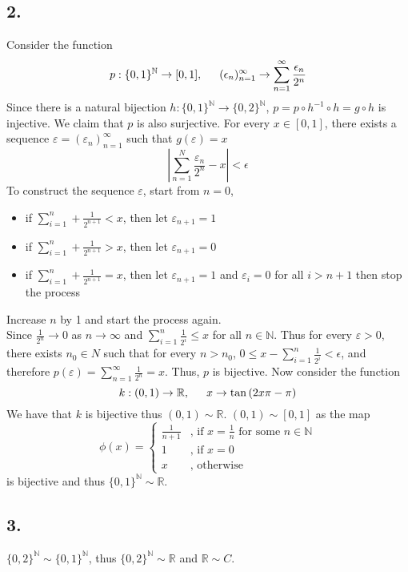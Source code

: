 \documentclass[11pt]{article}
\theoremstyle{mystyle}
\theoremstyle{definition}
\begin{document}
\subsection*{2.}
Consider the function 
\[
  p: \{0,1\}^\mathbb{N} \to [0,1], \indent (\epsilon_n)_{n=1}^\infty \to \sum_{n=1}^\infty \displaystyle\frac{\epsilon_n}{2^n}  
\]
Since there is a natural bijection $h: \{0,1\}^\mathbb{N} \to \{0,2\}^\mathbb{N}$, $p = p \circ h^{-1} \circ h = g \circ h$ is injective. We claim that $p$ is also surjective. For every $x \in [0,1]$, there exists a sequence $\varepsilon =  (\varepsilon_n)_{n=1}^\infty$ such that $g(\varepsilon) = x$ 
\[
  \left|\sum_{n=1}^N \frac{\varepsilon_n}{2^n} - x \right| < \epsilon
\]
To construct the sequence $\varepsilon$, start from $n=0$, 
\begin{itemize}
  \item if $\sum_{i=1}^n + \displaystyle\frac{1}{2^{n+1}} < x$, then let $\varepsilon_{n+1} = 1$
  \item if $\sum_{i=1}^n + \displaystyle\frac{1}{2^{n+1}} > x$, then let $\varepsilon_{n+1} = 0$ 
  \item if $\sum_{i=1}^n + \displaystyle\frac{1}{2^{n+1}} = x$, then let $\varepsilon_{n+1} = 1$ and $\varepsilon_{i} = 0$ for all $i>n+1$ then stop the process
\end{itemize}
Increase $n$ by 1 and start the process again. \\
Since $\displaystyle\frac{1}{2^n} \to 0$ as $n \to \infty$ and $\sum_{i=1}^n \frac{1}{2^i} \le x$ for all $n \in \mathbb{N}$. Thus for every $\varepsilon >0$, there exists $n_0 \in N$ such that for every $n>n_0$, $0 \le x - \sum_{i=1}^n \frac{1}{2^i}< \epsilon$, and therefore $p(\varepsilon) = \sum_{n=1}^\infty \frac{1}{2^n} = x$. Thus, $p$ is bijective. 
Now consider the function 
\[
  k: (0,1) \to \mathbb{R}, \indent x \to \tan\left(2 x \pi - \pi \right)
\]
We have that $k$ is bijective thus $(0,1) \sim \mathbb{R}$. $(0,1) \sim [0,1]$ as the map
\[
  \phi(x) = 
  \begin{cases}
    \frac{1}{n+1} & \text{, if } x = \frac{1}{n} \text{ for some } n \in \mathbb{N} \\
    1 & \text{, if } x = 0 \\
    x & \text{, otherwise }
  \end{cases}
\]
is bijective and thus $\{0,1 \}^\mathbb{N} \sim \mathbb{R}$.  
\subsection*{3.}
$\{0,2\}^\mathbb{N} \sim \{0,1\}^\mathbb{N}$, thus $\{0,2\}^\mathbb{N} \sim \mathbb{R}$ and $\mathbb{R} \sim C$. 
\end{document}
